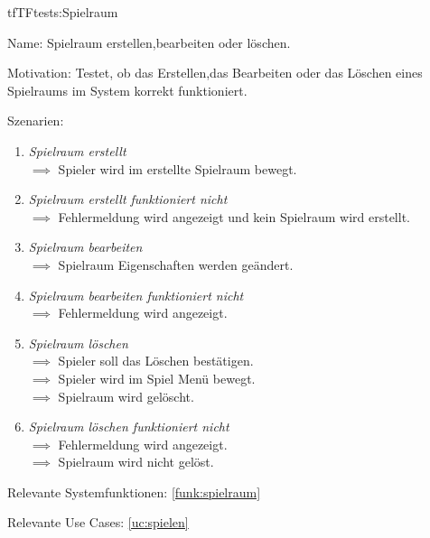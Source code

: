 \begin{description}[leftmargin=5em, style=sameline]

\begin{lhp}{tf}{TF}{tests:Spielraum}
	\item [Name:] Spielraum erstellen,bearbeiten oder löschen.
	\item [Motivation:] Testet, ob das Erstellen,das Bearbeiten oder das Löschen eines Spielraums im System korrekt funktioniert.
	\item [Szenarien:] \hfill
		\begin{enumerate}
			\item \textit{Spielraum erstellt} \\ $\implies$ Spieler wird im erstellte Spielraum bewegt.
			\item \textit{Spielraum erstellt funktioniert nicht} \\ $\implies$ Fehlermeldung wird angezeigt und kein Spielraum wird erstellt.
			\item \textit{Spielraum bearbeiten} \\ $\implies$ Spielraum Eigenschaften werden geändert.
			\item \textit{Spielraum bearbeiten funktioniert nicht} \\ $\implies$ Fehlermeldung wird angezeigt.
			\item \textit{Spielraum löschen} \\ $\implies$ Spieler soll das Löschen bestätigen.
							         \\ $\implies$ Spieler wird im Spiel Menü bewegt.
\\ $\implies$ Spielraum wird gelöscht.
			\item \textit{Spielraum löschen funktioniert nicht} \\ $\implies$ Fehlermeldung wird angezeigt.
\\ $\implies$ Spielraum wird nicht gelöst.
		\end{enumerate}
	\item [Relevante Systemfunktionen:] \ref{funk:spielraum}
	\item [Relevante Use Cases:] \ref{uc:spielen}
\end{lhp}

\end{description}

